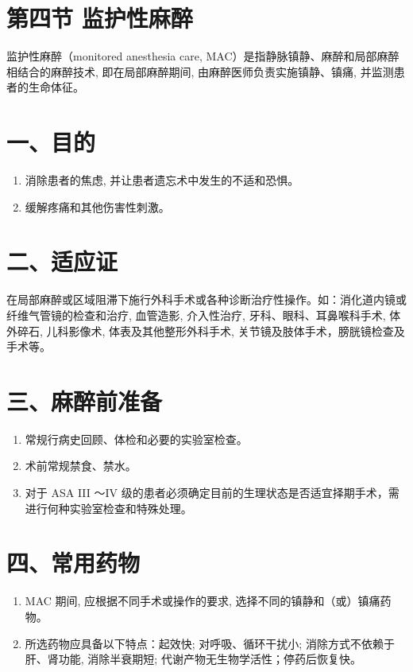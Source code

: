 \documentclass[10pt]{article}
\begin{document}
\section*{第四节 监护性麻醉}
监护性麻醉（monitored anesthesia care, MAC）是指静脉镇静、麻醉和局部麻醉相结合的麻醉技术, 即在局部麻醉期间, 由麻醉医师负责实施镇静、镇痛, 并监测患者的生命体征。

\section*{一、目的}
\begin{enumerate}
  \item 消除患者的焦虑, 并让患者遗忘术中发生的不适和恐惧。

  \item 缓解疼痛和其他伤害性刺激。

\end{enumerate}

\section*{二、适应证}
在局部麻醉或区域阻滞下施行外科手术或各种诊断治疗性操作。如：消化道内镜或纤维气管镜的检查和治疗, 血管造影, 介入性治疗, 牙科、眼科、耳鼻喉科手术, 体外碎石, 儿科影像术, 体表及其他整形外科手术, 关节镜及肢体手术，膀胱镜检查及手术等。

\section*{三、麻醉前准备}
\begin{enumerate}
  \item 常规行病史回顾、体检和必要的实验室检查。

  \item 术前常规禁食、禁水。

  \item 对于 ASA III 〜IV 级的患者必须确定目前的生理状态是否适宜择期手术，需进行何种实验室检查和特殊处理。

\end{enumerate}

\section*{四、常用药物}
\begin{enumerate}
  \item MAC 期间, 应根据不同手术或操作的要求, 选择不同的镇静和（或）镇痛药物。

  \item 所选药物应具备以下特点：起效快; 对呼吸、循环干扰小; 消除方式不依赖于肝、肾功能, 消除半衰期短; 代谢产物无生物学活性；停药后恢复快。

\end{enumerate}
\end{document}
